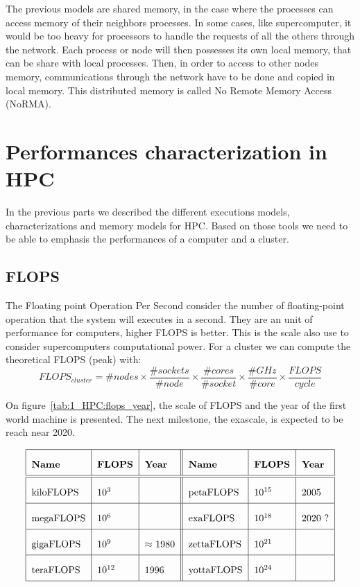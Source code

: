 The previous models are shared memory, in the case where the processes can access memory of their neighbors processes. 
In some cases, like supercomputer, it would be too heavy for processors to handle the requests of all the others through the network. 
Each process or node will then possesses its own local memory, that can be share with local processes. 
Then, in order to access to other nodes memory, communications through the network have to be done and copied in local memory. 
This distributed memory is called No Remote Memory Access (NoRMA).

\section{Performances characterization in HPC}
In the previous parts we described the different executions models, characterizations and memory models for HPC. 
Based on those tools we need to be able to emphasis the performances of a computer and a cluster. 

\subsection{FLOPS}
The Floating point Operation Per Second consider the number of floating-point operation that the system will executes in a second. 
They are an unit of performance for computers, higher FLOPS is better. 
This is the scale also use to consider supercomputers computational power. 
For a cluster we can compute the theoretical FLOPS (peak) with:
\begin{equation}
FLOPS_{cluster} = \#nodes \times \frac{\#sockets}{\#node} \times \frac{\#cores}{\#socket} \times \frac{\#GHz}{\#core} \times \frac{FLOPS}{cycle}
\end{equation}

On figure~\ref{tab:1_HPC:flops_year}, the scale of FLOPS and the year of the first world machine is presented.
The next milestone, the exascale, is expected to be reach near 2020.  

\begin{table}
\[\arraycolsep=1.4pt\def\arraystretch{2.2}
\begin{tabular}{| l | l | l || l | l | l |}
\hline
	\textbf{Name} & \textbf{FLOPS} & \textbf{Year} & \textbf{Name} & \textbf{FLOPS} & \textbf{Year} \\
	\hline
	\hline
	kiloFLOPS & $10^{3}$ & & petaFLOPS  & $10^{15}$ & 2005 \\ 
	\hline
	megaFLOPS & $10^{6}$ & & exaFLOPS   & $10^{18}$ & 2020 ? \\
	\hline
	gigaFLOPS & $10^{9}$ & $\approx$ 1980  & zettaFLOPS & $10^{21}$ & \\
	\hline
	teraFLOPS & $10^{12}$ & 1996 & yottaFLOPS & $10^{24}$ & \\
	\hline
	\end{tabular}
	\]
	\caption{Floating-point Operation per Second and years of reach in HPC.}
	\label{tab:1_HPC:flops_year}
\end{table}

